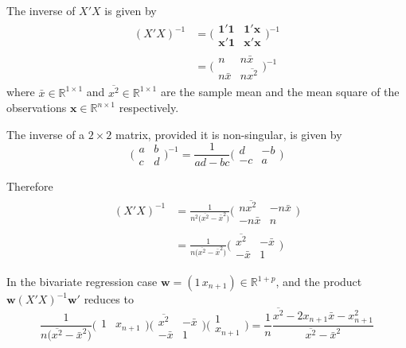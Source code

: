 \documentclass[a4paper]{article}
\newcommand{\w}{\mathbf{w}}
\newcommand{\e}{\mathbf{1}}
\newcommand{\Real}{\mathbb{R}}
\begin{document}
The inverse of $X'X$ is given by
\begin{align*}
 	(X'X)^{-1}
 	&= \bigg(\begin{matrix}\e'\e & \e'\mathbf{x} \\ \mathbf{x}'\e & \mathbf{x}'\mathbf{x}\end{matrix}\bigg)^{-1}\\
 	&= \bigg(\begin{matrix}n & n\bar{x} \\ n\bar{x} & n\overline{x^2}\end{matrix}\bigg)^{-1}
 \end{align*} 
where $\bar{x}\in \Real^{1\times 1}$ and $\overline{x^2}\in \Real^{1\times 1}$
are the sample mean and the mean square of the observations $\mathbf{x}\in \Real^{n\times 1}$ respectively.

The inverse of a $2\times 2$ matrix, provided it is non-singular, is given by
\[\bigg(\begin{matrix} a & b\\c & d\end{matrix}\bigg)^{-1} = \frac{1}{ad-bc}\bigg(\begin{matrix} d & -b\\-c & a\end{matrix}\bigg)\]

Therefore 
\begin{align*}
 	(X'X)^{-1}
 	&= \frac{1}{n^2 \big( \overline{x^2} - \bar{x}^2 \big)} \bigg(\begin{matrix} n\overline{x^2} & -n\bar{x} \\ -n\bar{x} & n \end{matrix}\bigg)\\
 	&= \frac{1}{n \big( \overline{x^2} - \bar{x}^2 \big)} \bigg(\begin{matrix} \overline{x^2} & -\bar{x} \\ -\bar{x} & 1 \end{matrix}\bigg)
\end{align*}

In the bivariate regression case $\w = (1\, x_{n+1})\in \Real^{1+p}$, and the
product $\w (X'X)^{-1}\w'$ reduces to
\[\frac{1}{n \big( \overline{x^2} - \bar{x}^2 \big)} \big(\begin{matrix}1 & x_{n+1}\end{matrix}\big) \bigg(\begin{matrix} \overline{x^2} & -\bar{x} \\ -\bar{x} & 1 \end{matrix}\bigg) \bigg(\begin{matrix}1 \\ x_{n+1}\end{matrix}\bigg) = \frac{1}{n}\frac{ \overline{x^2} - 2 x_{n+1}\bar{x} - x_{n+1}^2 }{ \overline{x^2} - \bar{x}^2} \]
\end{document}
